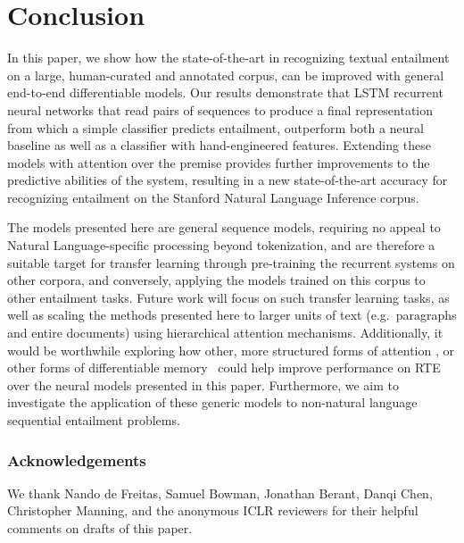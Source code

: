 \documentclass{article}
\begin{document}
\section{Conclusion}

In this paper, we show how the state-of-the-art in recognizing textual entailment on a large, human-curated and annotated corpus, can be improved with general end-to-end differentiable models.
Our results demonstrate that LSTM recurrent neural networks that read pairs of sequences to produce a final representation from which a simple classifier predicts entailment, outperform both a neural baseline as well as a classifier with hand-engineered features.
Extending these models with attention over the premise provides further improvements to the predictive abilities of the system, resulting in a new state-of-the-art accuracy for recognizing entailment on the Stanford Natural Language Inference corpus.

The models presented here are general sequence models, requiring no appeal to Natural Language-specific processing beyond tokenization, and are therefore a suitable target for transfer learning through pre-training the recurrent systems on other corpora, and conversely, applying the models trained on this corpus to other entailment tasks.
Future work will focus on such transfer learning tasks, as well as scaling the methods presented here to larger units of text (e.g.~paragraphs and entire documents) using hierarchical attention mechanisms. Additionally, it would be worthwhile exploring how other, more structured forms of attention \citep[e.g.][]{graves2014neural,sukhbaatar2015end}, or other forms of differentiable memory \citep[e.g.][]{grefenstette2015learning,Joulin:2015:Stack}~could help improve performance on RTE over the neural models presented in this paper.
Furthermore, we aim to investigate the application of these generic models to non-natural language sequential entailment problems.

\subsubsection*{Acknowledgements}
 We thank Nando de Freitas, Samuel Bowman, Jonathan Berant, Danqi Chen, Christopher Manning, and the anonymous ICLR reviewers for their helpful comments on drafts of this paper.

{ \small


}
\end{document}
